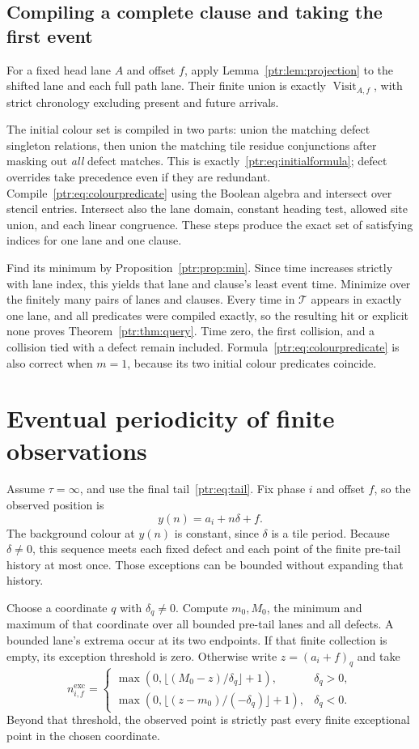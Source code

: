\documentclass[11pt,letterpaper]{article}
\theoremstyle{definition}\newtheorem{definition}[theorem]{Definition}
\theoremstyle{remark}\newtheorem{remark}[theorem]{Remark}
\begin{document}
\subsection{Compiling a complete clause and taking the first event}
For a fixed head lane $A$ and offset $f$, apply Lemma~\ref{ptr:lem:projection} to the shifted lane and each full path lane. Their finite union is exactly $\operatorname{Visit}_{A,f}$, with strict chronology excluding present and future arrivals.

The initial colour set is compiled in two parts: union the matching defect singleton relations, then union the matching tile residue conjunctions after masking out \emph{all} defect matches. This is exactly~\eqref{ptr:eq:initialformula}; defect overrides take precedence even if they are redundant. Compile~\eqref{ptr:eq:colourpredicate} using the Boolean algebra and intersect over stencil entries. Intersect also the lane domain, constant heading test, allowed site union, and each linear congruence. These steps produce the exact set of satisfying indices for one lane and one clause.

Find its minimum by Proposition~\ref{ptr:prop:min}. Since time increases strictly with lane index, this yields that lane and clause's least event time. Minimize over the finitely many pairs of lanes and clauses. Every time in $\mathcal T$ appears in exactly one lane, and all predicates were compiled exactly, so the resulting hit or explicit none proves Theorem~\ref{ptr:thm:query}. Time zero, the first collision, and a collision tied with a defect remain included. Formula~\eqref{ptr:eq:colourpredicate} is also correct when $m=1$, because its two initial colour predicates coincide.

\section{Eventual periodicity of finite observations}\label{ptr:sec:periodicity}
Assume $\tau=\infty$, and use the final tail~\eqref{ptr:eq:tail}. Fix phase $i$ and offset $f$, so the observed position is
\[
 y(n)=a_i+n\delta+f.
\]
The background colour at $y(n)$ is constant, since $\delta$ is a tile period. Because $\delta\ne0$, this sequence meets each fixed defect and each point of the finite pre-tail history at most once. Those exceptions can be bounded without expanding that history.

Choose a coordinate $q$ with $\delta_q\ne0$. Compute $m_0,M_0$, the minimum and maximum of that coordinate over all bounded pre-tail lanes and all defects. A bounded lane's extrema occur at its two endpoints. If that finite collection is empty, its exception threshold is zero. Otherwise write $z=(a_i+f)_q$ and take
\begin{equation}\label{ptr:eq:exception}
 n_{i,f}^{\mathrm{exc}}=
 \begin{cases}
 \max(0,\lfloor(M_0-z)/\delta_q\rfloor+1),&\delta_q>0,\\
 \max(0,\lfloor(z-m_0)/(-\delta_q)\rfloor+1),&\delta_q<0.
 \end{cases}
\end{equation}
Beyond that threshold, the observed point is strictly past every finite exceptional point in the chosen coordinate.
\end{document}
